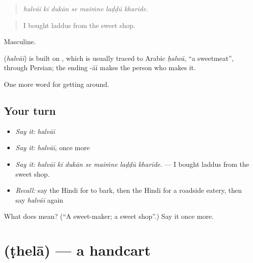 \begin{quote}
      
\end{quote}

\begin{quote}
\emph{halvāī kī dukān se maiṁne laḍḍū kharīde.}
\end{quote}

\begin{quote}
I bought laddus from the sweet shop.
\end{quote}

Masculine.

\begin{cousinweb}
\textbf{} (\emph{halvāī}) is built on , which is usually traced to Arabic \emph{ḥalwā}, \textquotedblleft{}a sweetmeat\textquotedblright{}, through Persian; the ending -āī makes the person who makes it.
\end{cousinweb}

\begin{grammarlens}[title={What you've built}]
One more word for getting around.
\end{grammarlens}

\subsection*{Your turn}
\begin{itemize}
\raggedright
  \item \emph{Say it:} \emph{halvāī}
  \item \emph{Say it:} \emph{halvāī}, once more
  \item \emph{Say it:} \emph{halvāī kī dukān se maiṁne laḍḍū kharīde.} — I bought laddus from the sweet shop.
  \item \emph{Recall:} say the Hindi for to bark, then the Hindi for a roadside eatery, then say \emph{halvāī} again
\end{itemize}

\begin{tcolorbox}[breakable,colback=teal!4,colframe=teal!35!black,title={Before you move on}]
What does  mean? (\textquotedblleft{}A sweet-maker; a sweet shop\textquotedblright{}.) Say it once more.
\end{tcolorbox}
\section[\texorpdfstring{\hi{ठेला} (ṭhelā)}{ठेला (ṭhelā)}]{ (ṭhelā) — a handcart}

